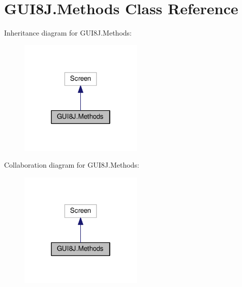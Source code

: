 \hypertarget{classGUI8J_1_1Methods}{}\section{G\+U\+I8\+J.\+Methods Class Reference}
\label{classGUI8J_1_1Methods}


Inheritance diagram for G\+U\+I8\+J.\+Methods\+:
\nopagebreak
\begin{figure}[H]
\begin{center}
\leavevmode
\includegraphics[width=166pt]{classGUI8J_1_1Methods__inherit__graph}
\end{center}
\end{figure}


Collaboration diagram for G\+U\+I8\+J.\+Methods\+:
\nopagebreak
\begin{figure}[H]
\begin{center}
\leavevmode
\includegraphics[width=166pt]{classGUI8J_1_1Methods__coll__graph}
\end{center}
\end{figure}
